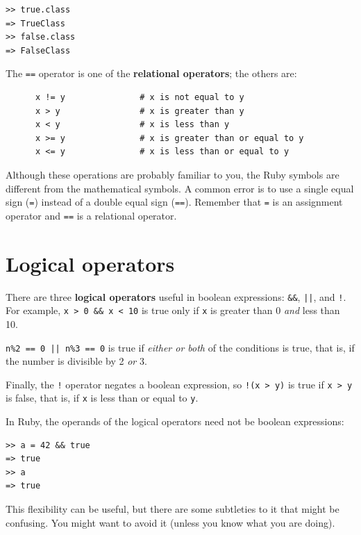 \documentclass[10pt]{book}
\begin{document}
\begin{verbatim}
>> true.class
=> TrueClass
>> false.class
=> FalseClass
\end{verbatim}
%
The {\tt ==} operator is one of the {\bf relational operators}; the
others are:

\begin{verbatim}
      x != y               # x is not equal to y
      x > y                # x is greater than y
      x < y                # x is less than y
      x >= y               # x is greater than or equal to y
      x <= y               # x is less than or equal to y
\end{verbatim}
%
Although these operations are probably familiar to you, the Ruby
symbols are different from the mathematical symbols.  A common error
is to use a single equal sign ({\tt =}) instead of a double equal sign
({\tt ==}).  Remember that {\tt =} is an assignment operator and
{\tt ==} is a relational operator.


\section {Logical operators}

There are three {\bf logical operators} useful in boolean expressions:
{\tt \&\&}, {\tt ||}, and {\tt !}.
For example, {\tt x > 0 \&\& x < 10} is true only if {\tt x} is greater than 0
{\em and} less than 10.

{\tt n\%2 == 0 || n\%3 == 0} is true if {\em either or both} of the
conditions is true, that is, if the number is divisible by 2 {\em or}
3.

Finally, the {\tt !} operator negates a boolean
expression, so {\tt !(x > y)} is true if {\tt x > y} is false,
that is, if {\tt x} is less than or equal to {\tt y}.

In Ruby, the operands of the logical operators need not be
boolean expressions:

\begin{verbatim}
>> a = 42 && true
=> true
>> a
=> true
\end{verbatim}
%
This flexibility can be useful, but there are some subtleties to
it that might be confusing.  You might want to avoid it (unless
you know what you are doing).
\end{document}

